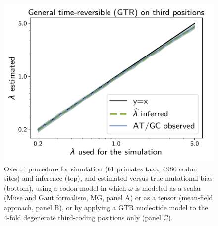 \documentclass{article}
\begin{document}
\begin{figure}[!htb]
\begin{minipage}{0.325\linewidth}
 \end{minipage}
 \hfill
 \begin{minipage}{0.325\linewidth}
 	\includegraphics[width=\linewidth, page=1]{inference_simulations/lambda_GTR}
 \end{minipage}
 \hfill
 \caption[Estimation of mutational bias]{
  Overall procedure for simulation (61 primates taxa, 4980 codon sites) and inference (top), and estimated versus true mutational bias (bottom), using a codon model in which $\omega$ is modeled as a scalar (Muse and Gaut formalism, MG, panel A) or as a tensor (mean-field approach, panel B), or by applying a GTR nucleotide model to the 4-fold degenerate third-coding positions only (panel C).
 }
 \label{fig:mut-bias-inference}
\end{figure}
\end{document}
